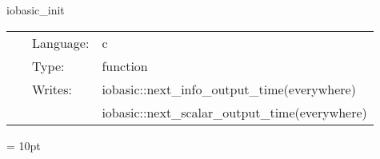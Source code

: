 
\hspace{5mm} iobasic\_init 

\hspace{5mm}{\it initialisation routine } 


\hspace{5mm}

 \begin{tabular*}{160mm}{cll} 
~ & Language:  & c \\ 
~ & Type:  & function \\ 
~ & Writes:  & iobasic::next\_info\_output\_time(everywhere) \\ 
~& ~ &iobasic::next\_scalar\_output\_time(everywhere)\\ 
\end{tabular*} 



\vspace{5mm}\parskip = 10pt 
